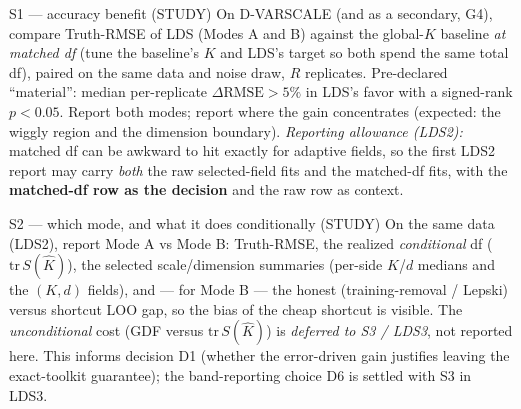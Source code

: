 \documentclass[11pt]{article}
\begin{document}
\begin{gate}{S1 --- accuracy benefit (STUDY)}
On D-VARSCALE (and as a secondary, G4), compare Truth-RMSE of LDS (Modes A and B)
against the global-$K$ baseline \emph{at matched df} (tune the baseline's $K$ and
LDS's target so both spend the same total df), paired on the same data and noise draw,
$R$ replicates. Pre-declared ``material'': median per-replicate
$\Delta\text{RMSE}>5\%$ in LDS's favor with a signed-rank $p<0.05$. Report both modes;
report where the gain concentrates (expected: the wiggly region and the dimension
boundary). \emph{Reporting allowance (LDS2):} matched df can be awkward to hit exactly for
adaptive fields, so the first LDS2 report may carry \emph{both} the raw selected-field fits
and the matched-df fits, with the \textbf{matched-df row as the decision} and the raw row as
context.
\end{gate}

\begin{gate}{S2 --- which mode, and what it does conditionally (STUDY)}
On the same data (LDS2), report Mode A vs Mode B: Truth-RMSE, the realized
\emph{conditional} df ($\mathrm{tr}\,S(\hat K)$), the selected scale/dimension summaries
(per-side $K$/$d$ medians and the $(K,d)$ fields), and --- for Mode B --- the honest
(training-removal / Lepski) versus shortcut LOO gap, so the bias of the cheap shortcut is
visible. The \emph{unconditional} cost (GDF versus $\mathrm{tr}\,S(\hat K)$) is
\emph{deferred to S3 / LDS3}, not reported here. This informs decision D1 (whether the
error-driven gain justifies leaving the exact-toolkit guarantee); the band-reporting choice
D6 is settled with S3 in LDS3.
\end{gate}
\end{document}
